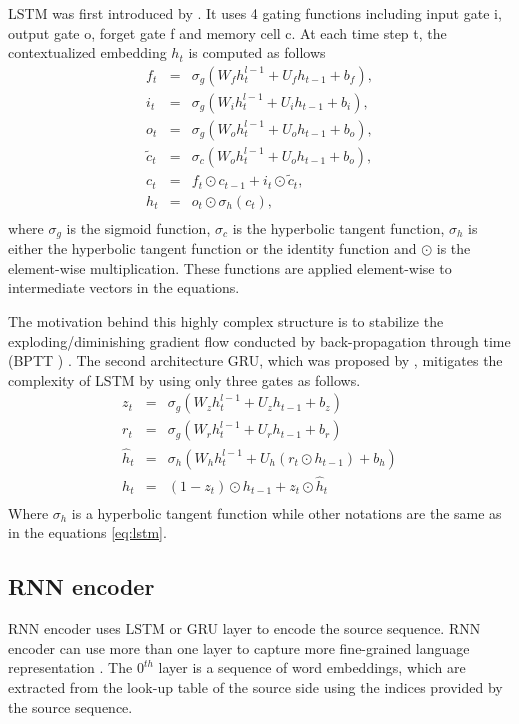 LSTM was first introduced by \citet{Hochreiter97long}. It uses 4 gating functions including input gate i, output gate o, forget gate f and memory cell c. At each time step t, the contextualized embedding $h_t$ is computed as follows
\begin{equation}
\label{eq:lstm}
\begin{array}{rcl}
f_t &=& \sigma_g (W_f h^{l-1}_t + U_f h_{t-1} + b_f),\\
i_t &=& \sigma_g (W_i h^{l-1}_t + U_i h_{t-1} + b_i),\\
o_t &=& \sigma_g (W_o h^{l-1}_t + U_o h_{t-1} + b_o),\\
\tilde{c}_t &=& \sigma_c (W_o h^{l-1}_t + U_o h_{t-1} + b_o),\\
c_t &=& f_t \odot c_{t-1} + i_t \odot \tilde{c}_t,\\
h_t &=& o_t \odot \sigma_h(c_t),\\
\end{array}
\end{equation}
where $\sigma_g$ is the sigmoid function, $\sigma_c$ is the hyperbolic tangent function, $\sigma_h$ is either the hyperbolic tangent function or the identity function and $\odot$ is the element-wise multiplication. These functions are applied element-wise to intermediate vectors in the equations.

The motivation behind this highly complex structure is to stabilize the exploding/diminishing gradient flow \citep{Pascanu13onthe} conducted by back-propagation through time (BPTT ) \citep{Hochreiter97long}. The second architecture GRU, which was proposed by \citet{Cho14properties}, mitigates the complexity of LSTM by using only three gates as follows.
\begin{equation}
\label{eq:gru}
\begin{array}{rcl}
z_t &=& \sigma_g (W_z h^{l-1}_t + U_z h_{t-1} + b_z)\\
r_t &=& \sigma_g (W_r h^{l-1}_t + U_r h_{t-1} + b_r)\\
\hat{h}_t &=& \sigma_h (W_h h^{l-1}_t + U_h (r_t \odot h_{t-1}) + b_h)\\
h_t &=& (1-z_t)\odot h_{t-1} + z_t \odot \hat{h}_t\\
\end{array}
\end{equation}
Where $\sigma_h$ is a hyperbolic tangent function while other notations are the same as in the equations \ref{eq:lstm}.
\subsection{RNN encoder}
RNN encoder uses LSTM or GRU layer to encode the source sequence. RNN encoder can use more than one layer to capture more fine-grained language representation \citep{Li20shallow}. The $0^{th}$ layer is a sequence of word embeddings, which are extracted from the look-up table of the source side using the indices provided by the source sequence. 

